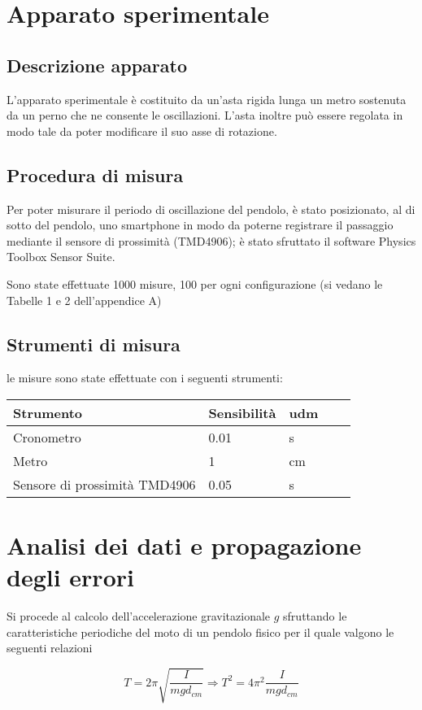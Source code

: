 \documentclass[11pt,a4paper]{article}
\begin{document}
\section{Apparato sperimentale}
\subsection{Descrizione apparato}
L'apparato sperimentale è costituito da un'asta rigida lunga un metro sostenuta da un perno che ne consente le oscillazioni.
L'asta inoltre può essere regolata in modo tale da poter modificare il suo asse di rotazione.

\subsection{Procedura di misura}
Per poter misurare il periodo di oscillazione del pendolo, è stato posizionato, al di sotto del pendolo, uno smartphone in modo da poterne registrare il passaggio mediante il sensore di prossimità (TMD4906); è stato sfruttato il software Physics Toolbox Sensor Suite.

Sono state effettuate 1000 misure, 100 per ogni configurazione (si vedano le Tabelle 1 e 2 dell'appendice A)

\subsection{Strumenti di misura}
le misure sono state effettuate con i seguenti strumenti:
\begin{longtable}[]{@{}lllll@{}}
\toprule
Strumento & Sensibilità & udm \tabularnewline
\midrule
\endhead
Cronometro & 0.01 & s \tabularnewline
Metro & 1 & cm \tabularnewline
Sensore di prossimità TMD4906 & 0.05 & s \tabularnewline
\bottomrule
\end{longtable}

\section{Analisi dei dati e propagazione degli errori}
Si procede al calcolo dell'accelerazione gravitazionale $g$ sfruttando le caratteristiche periodiche del moto di un pendolo fisico per il quale valgono le seguenti relazioni

\begin{equation}
T=2\pi\sqrt{\frac{I}{mgd_{cm}}} \Longrightarrow T^2=4\pi^2\frac{I}{mgd_{cm}} 
\end{equation}
\end{document}

